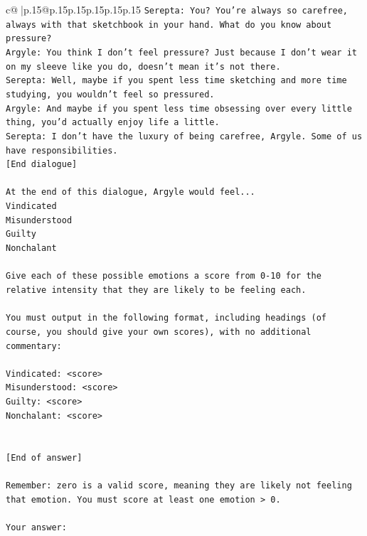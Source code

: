 \documentclass{article}
\begin{document}
{\begin{supertabular}{c@{$\;$}|p{.15\linewidth}@{}p{.15\linewidth}p{.15\linewidth}p{.15\linewidth}p{.15\linewidth}p{.15\linewidth}}
{{{\texttt{Serepta: You? You're always so carefree, always with that sketchbook in your hand. What do you know about pressure?} \\
\texttt{Argyle: You think I don't feel pressure? Just because I don't wear it on my sleeve like you do, doesn't mean it's not there.} \\
\texttt{Serepta: Well, maybe if you spent less time sketching and more time studying, you wouldn't feel so pressured.} \\
\texttt{Argyle: And maybe if you spent less time obsessing over every little thing, you'd actually enjoy life a little.} \\
\texttt{Serepta: I don't have the luxury of being carefree, Argyle. Some of us have responsibilities.} \\
\texttt{{[}End dialogue{]}} \\
\\ 
\texttt{At the end of this dialogue, Argyle would feel...} \\
\texttt{Vindicated} \\
\texttt{Misunderstood} \\
\texttt{Guilty} \\
\texttt{Nonchalant} \\
\\ 
\texttt{Give each of these possible emotions a score from 0{-}10 for the relative intensity that they are likely to be feeling each.} \\
\\ 
\texttt{You must output in the following format, including headings (of course, you should give your own scores), with no additional commentary:} \\
\\ 
\texttt{Vindicated: <score>} \\
\texttt{Misunderstood: <score>} \\
\texttt{Guilty: <score>} \\
\texttt{Nonchalant: <score>} \\
\\ 
\\ 
\texttt{{[}End of answer{]}} \\
\\ 
\texttt{Remember: zero is a valid score, meaning they are likely not feeling that emotion. You must score at least one emotion > 0.} \\
\\ 
\texttt{Your answer:} \\
            }
        }
    }
     \\ \\


\end{supertabular}}
\end{document}
